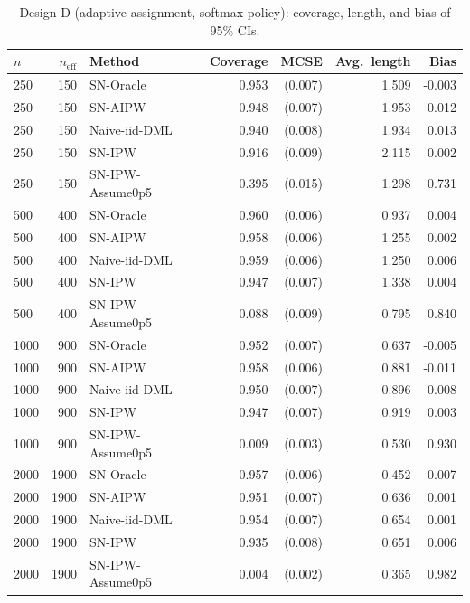 \documentclass[11pt]{article}
\numberwithin{equation}{section}
\newcommand{\mcse}[1]{{\footnotesize\,(#1)}}
\theoremstyle{plain}
\theoremstyle{definition}
\theoremstyle{remark}
\begin{document}
\begin{table}[!htbp]
\centering
\small
\begin{threeparttable}
\caption{Design D (adaptive assignment, softmax policy): coverage, length, and bias of 95\% CIs.}
\label{tab:simD_softmax}
\begin{tabular}{@{}l r l r r r r@{}}
\toprule
{$n$} & {$n_{\mathrm{eff}}$} & {Method} & {Coverage} & {MCSE} & {Avg.\ length} & {Bias} \\
\midrule
250 & 150 & SN-Oracle & 0.953 & \mcse{0.007} & 1.509 & -0.003 \\
250 & 150 & SN-AIPW & 0.948 & \mcse{0.007} & 1.953 & 0.012 \\
250 & 150 & Naive-iid-DML & 0.940 & \mcse{0.008} & 1.934 & 0.013 \\
250 & 150 & SN-IPW & 0.916 & \mcse{0.009} & 2.115 & 0.002 \\
250 & 150 & SN-IPW-Assume0p5 & 0.395 & \mcse{0.015} & 1.298 & 0.731 \\
500 & 400 & SN-Oracle & 0.960 & \mcse{0.006} & 0.937 & 0.004 \\
500 & 400 & SN-AIPW & 0.958 & \mcse{0.006} & 1.255 & 0.002 \\
500 & 400 & Naive-iid-DML & 0.959 & \mcse{0.006} & 1.250 & 0.006 \\
500 & 400 & SN-IPW & 0.947 & \mcse{0.007} & 1.338 & 0.004 \\
500 & 400 & SN-IPW-Assume0p5 & 0.088 & \mcse{0.009} & 0.795 & 0.840 \\
1000 & 900 & SN-Oracle & 0.952 & \mcse{0.007} & 0.637 & -0.005 \\
1000 & 900 & SN-AIPW & 0.958 & \mcse{0.006} & 0.881 & -0.011 \\
1000 & 900 & Naive-iid-DML & 0.950 & \mcse{0.007} & 0.896 & -0.008 \\
1000 & 900 & SN-IPW & 0.947 & \mcse{0.007} & 0.919 & 0.003 \\
1000 & 900 & SN-IPW-Assume0p5 & 0.009 & \mcse{0.003} & 0.530 & 0.930 \\
2000 & 1900 & SN-Oracle & 0.957 & \mcse{0.006} & 0.452 & 0.007 \\
2000 & 1900 & SN-AIPW & 0.951 & \mcse{0.007} & 0.636 & 0.001 \\
2000 & 1900 & Naive-iid-DML & 0.954 & \mcse{0.007} & 0.654 & 0.001 \\
2000 & 1900 & SN-IPW & 0.935 & \mcse{0.008} & 0.651 & 0.006 \\
2000 & 1900 & SN-IPW-Assume0p5 & 0.004 & \mcse{0.002} & 0.365 & 0.982 \\

\end{tabular}
\end{threeparttable}
\end{table}
\end{document}
